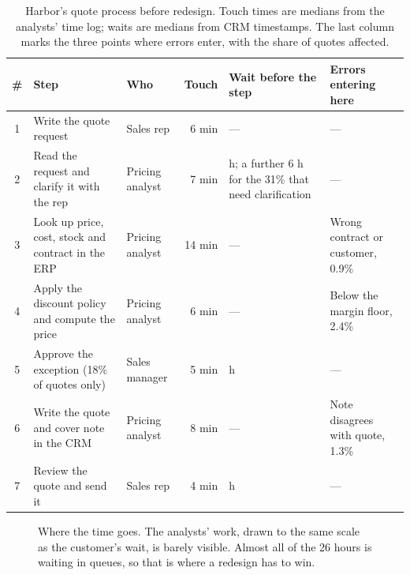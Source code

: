 \begin{table}[htbp]
\centering
\small
\caption{Harbor's quote process before redesign. Touch times are medians from the analysts' time log; waits are medians from CRM timestamps. The last column marks the three points where errors enter, with the share of quotes affected.}
\label{tab:harbor-map}
\begin{tabularx}{\textwidth}{@{}c>{\raggedright\arraybackslash}X>{\raggedright\arraybackslash}p{2.3cm}r>{\raggedright\arraybackslash}p{2.9cm}>{\raggedright\arraybackslash}p{2.5cm}@{}}
\toprule
\rowcolor{coHead} \# & Step & Who & Touch & Wait before the step & Errors entering here \\
\midrule
1 & Write the quote request & Sales rep & 6 min & --- & --- \\
2 & Read the request and clarify it with the rep & Pricing analyst & 7 min & 9 h; a further 6 h for the 31\% that need clarification & --- \\
3 & Look up price, cost, stock and contract in the ERP & Pricing analyst & 14 min & --- & Wrong contract or customer, 0.9\% \\
4 & Apply the discount policy and compute the price & Pricing analyst & 6 min & --- & Below the margin floor, 2.4\% \\
5 & Approve the exception (18\% of quotes only) & Sales manager & 5 min & 11 h & --- \\
6 & Write the quote and cover note in the CRM & Pricing analyst & 8 min & --- & Note disagrees with quote, 1.3\% \\
7 & Review the quote and send it & Sales rep & 4 min & 4 h & --- \\
\bottomrule
\end{tabularx}
\end{table}

\begin{figure}[htbp]
\centering
{}
\caption{Where the time goes. The analysts' work, drawn to the same scale as the customer's wait, is barely visible. Almost all of the 26 hours is waiting in queues, so that is where a redesign has to win.}
\label{fig:time-bar}
\end{figure}

